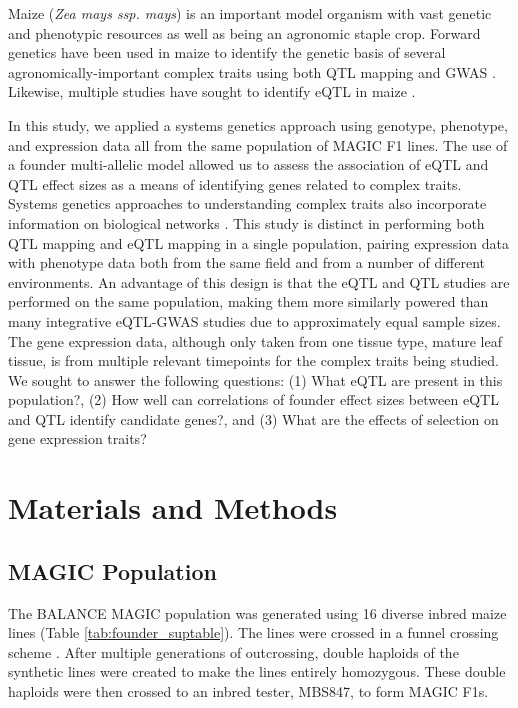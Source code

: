 \documentclass[article,9pt,twocolumn,twoside]{rilabRxiv}
\begin{document}
\par
Maize (\textit{Zea mays ssp. mays}) is an important model organism with vast genetic and phenotypic resources as well as being an agronomic staple crop.
Forward genetics have been used in maize to identify the genetic basis of several agronomically-important complex traits using both QTL mapping and GWAS \citep{Buckler,Li4,Wallace,Xue}.
Likewise, multiple studies have sought to identify eQTL in maize \citep{Liu6,Pang,Wang3}.
\par
In this study, we applied a systems genetics approach using genotype, phenotype, and expression data all from the same population of MAGIC F1 lines.
The use of a founder multi-allelic model allowed us to assess the association of eQTL and QTL effect sizes as a means of identifying genes related to complex traits.
Systems genetics approaches to understanding complex traits also incorporate information on biological networks \citep{CivelekLusis}.
This study is distinct in performing both QTL mapping and eQTL mapping in a single population, pairing expression data with phenotype data both from the same field and from a number of different environments.
An advantage of this design is that the eQTL and QTL studies are performed on the same population, making them more similarly powered than many integrative eQTL-GWAS studies due to approximately equal sample sizes.
The gene expression data, although only taken from one tissue type, mature leaf tissue, is from multiple relevant timepoints for the complex traits being studied.
We sought to answer the following questions:
(1) What eQTL are present in this population?, 
(2) How well can correlations of founder effect sizes between eQTL and QTL identify candidate genes?, and
(3) What are the effects of selection on gene expression traits?
\section{Materials and Methods}
\label{sec:materials:methods}
\subsection{MAGIC Population}
The BALANCE MAGIC population was generated using 16 diverse inbred maize lines (Table \ref{tab:founder_suptable}). 
The lines were crossed in a funnel crossing scheme \citep{Odell}. 
After multiple generations of outcrossing, double haploids of the synthetic lines were created to make the lines entirely homozygous. 
These double haploids were then crossed to an inbred tester, MBS847, to form MAGIC F1s.
\end{document}
